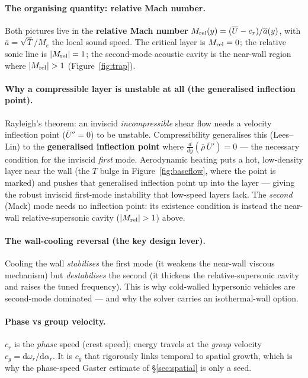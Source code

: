 \documentclass[11pt]{article}
\newcommand{\Mae}{M_e}
\renewcommand{\bar}[1]{\overline{#1}}
\begin{document}
\paragraph{The organising quantity: relative Mach number.} Both pictures live in the \textbf{relative Mach
number} $M_{\rm rel}(y)=(\bar U-c_r)/\bar a(y)$, with $\bar a=\sqrt{\bar T}/\Mae$ the local sound speed. The
critical layer is $M_{\rm rel}=0$; the relative sonic line is $|M_{\rm rel}|=1$; the second-mode acoustic
cavity is the near-wall region where $|M_{\rm rel}|>1$ (Figure~\ref{fig:trap}).

\paragraph{Why a compressible layer is unstable at all (the generalised inflection point).} Rayleigh's
theorem: an inviscid \emph{incompressible} shear flow needs a velocity inflection point ($\bar U''=0$) to be
unstable. Compressibility generalises this (Lees--Lin) to the \textbf{generalised inflection point} where
$\tfrac{d}{dy}(\bar\rho\,\bar U')=0$ --- the necessary condition for the inviscid \emph{first} mode.
Aerodynamic heating puts a hot, low-density layer near the wall (the $\bar T$ bulge in
Figure~\ref{fig:baseflow}, where the point is marked) and pushes that generalised inflection point up into the
layer --- giving the robust inviscid first-mode instability that low-speed layers lack. The \emph{second}
(Mack) mode needs no inflection point: its existence condition is instead the near-wall relative-supersonic
cavity ($|M_{\rm rel}|>1$) above.

\paragraph{The wall-cooling reversal (the key design lever).} Cooling the wall \emph{stabilises} the first
mode (it weakens the near-wall viscous mechanism) but \emph{destabilises} the second (it thickens the
relative-supersonic cavity and raises the tuned frequency). This is why cold-walled hypersonic vehicles are
second-mode dominated --- and why the solver carries an isothermal-wall option.

\paragraph{Phase vs group velocity.} $c_r$ is the \emph{phase} speed (crest speed); energy travels at the
\emph{group} velocity $c_g=\mathrm d\omega_r/\mathrm d\alpha_r$. It is $c_g$ that rigorously links temporal to
spatial growth, which is why the phase-speed Gaster estimate of \S\ref{sec:spatial} is only a seed.
\end{document}

